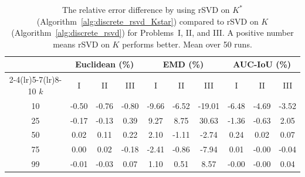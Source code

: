 \begin{table}[htbp]
\centering
    \begin{tabular}{c ccc ccc ccc}
    \toprule
        & \multicolumn{3}{c}{Euclidean (\%)}
        & \multicolumn{3}{c}{EMD (\%)}
        & \multicolumn{3}{c}{AUC-IoU (\%)} \\
    \cmidrule(lr){2-4}\cmidrule(lr){5-7}\cmidrule(lr){8-10}
        $k$ & I & II & III & I & II & III & I & II & III \\
    \midrule
        10 & -0.50 & -0.76 & -0.80 & -9.66 & -6.52 & -19.01 & -6.48 & -4.69 & -3.52 \\
        25 & -0.17 & -0.13 & 0.39 & 9.27 & 8.75 & 30.63 & -1.36 & -0.63 & 2.05 \\
        50 & 0.02 & 0.11 & 0.22 & 2.10 & -1.11 & -2.74 & 0.24 & 0.02 & 0.07 \\
        75 & 0.00 & 0.02 & -0.18 & -2.41 & -0.86 & -7.94 & 0.01 & -0.00 & -0.04 \\
        99 & -0.01 & -0.03 & 0.07 & 1.10 & 0.51 & 8.57 & -0.00 & -0.00 & 0.04 \\
    \bottomrule
    \end{tabular}
\caption{The relative error difference by using rSVD on $K^*$ (Algorithm~\ref{alg:discrete_rsvd_Kstar}) compared to rSVD on $K$ (Algorithm~\ref{alg:discrete_rsvd}) for Problems~I, II, and III. A positive number means rSVD on $K$ performs better. Mean over 50 runs.}
\label{tab:rsvd_adjoint_error}
\end{table}



